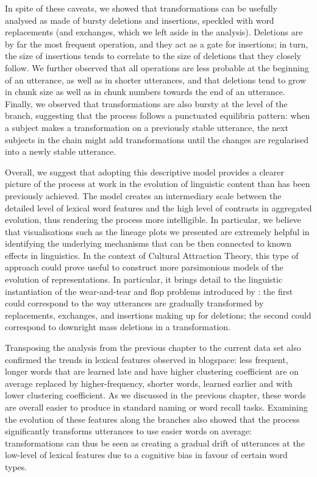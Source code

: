 In spite of these caveats, we showed that transformations can be
usefully analysed as made of bursty deletions and insertions, speckled
with word replacements (and exchanges, which we left aside in the
analysis). Deletions are by far the most frequent operation, and they
act as a gate for insertions; in turn, the size of insertions tends to
correlate to the size of deletions that they closely follow. We further
observed that all operations are less probable at the beginning of an
utterance, as well as in shorter utterances, and that deletions tend to
grow in chunk size as well as in chunk numbers towards the end of an
utterance. Finally, we observed that transformations are also bursty at
the level of the branch, suggesting that the process follows a
punctuated equilibria pattern: when a subject makes a transformation on
a previously stable utterance, the next subjects in the chain might add
transformations until the changes are regularised into a newly stable
utterance.

Overall, we suggest that adopting this descriptive model provides a
clearer picture of the process at work in the evolution of linguistic
content than has been previously achieved. The model creates an
intermediary scale between the detailed level of lexical word features
and the high level of contrasts in aggregated evolution, thus rendering
the process more intelligible. In particular, we believe that
visualisations such as the lineage plots we presented are extremely
helpful in identifying the underlying mechanisms that can be then
connected to known effects in linguistics. In the context of Cultural
Attraction Theory, this type of approach could prove useful to construct
more parsimonious models of the evolution of representations. In
particular, it brings detail to the linguistic instantiation of the
wear-and-tear and flop problems introduced by \textcite{morin_how_2016}:
the first could correspond to the way utterances are gradually
transformed by replacements, exchanges, and insertions making up for
deletions; the second could correspond to downright mass deletions in a
transformation.

Transposing the analysis from the previous chapter to the current data
set also confirmed the trends in lexical features observed in blogspace:
less frequent, longer words that are learned late and have higher
clustering coefficient are on average replaced by higher-frequency,
shorter words, learned earlier and with lower clustering coefficient. As
we discussed in the previous chapter, these words are overall easier to
produce in standard naming or word recall tasks. Examining the evolution
of these features along the branches also showed that the process
significantly transforms utterances to use easier words on average:
transformations can thus be seen as creating a gradual drift of
utterances at the low-level of lexical features due to a cognitive bias
in favour of certain word types.

